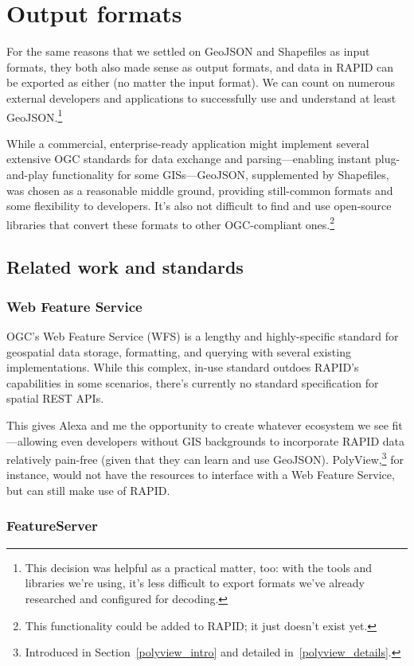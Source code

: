 \section{Output formats}
For the same reasons that we settled on GeoJSON and Shapefiles as input formats, they both also made sense as output formats, and data in RAPID can be exported as either (no matter the input format). We can count on numerous external developers and applications to successfully use and understand at least GeoJSON.\footnote{This decision was helpful as a practical matter, too: with the tools and libraries we're using, it's less difficult to export formats we've already researched and configured for decoding.}

While a commercial, enterprise-ready application might implement several extensive OGC standards for data exchange and parsing---enabling instant plug-and-play functionality for some GISs---GeoJSON, supplemented by Shapefiles, was chosen as a reasonable middle ground, providing still-common formats and some flexibility to developers. It's also not difficult to find and use open-source libraries that convert these formats to other OGC-compliant ones.\footnote{This functionality could be added to RAPID; it just doesn't exist yet.}

\subsection{Related work and standards}
\subsubsection{Web Feature Service}
OGC's Web Feature Service (WFS) is a lengthy and highly-specific standard for geospatial data storage, formatting, and querying with several existing implementations. While this complex, in-use standard outdoes RAPID's capabilities in some scenarios, there's currently no standard specification for spatial REST APIs.

This gives Alexa and me the opportunity to create whatever ecosystem we see fit---allowing even developers without GIS backgrounds to incorporate RAPID data relatively pain-free (given that they can learn and use GeoJSON). PolyView,\footnote{Introduced in Section~\ref{polyview_intro} and detailed in~\ref{polyview_details}.} for instance, would not have the resources to interface with a Web Feature Service, but can still make use of RAPID.

\subsubsection{FeatureServer}

